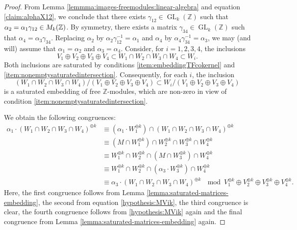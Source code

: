 \documentclass[a4paper,11pt,reqno]{amsart}
\numberwithin{equation}{section}
\theoremstyle{plain}
\theoremstyle{definition}
\newcommand{\Z}{\mathbb Z}
\let\rm\relax
\newcommand{\rm}[1]{{\mathrm{#1}}}
\newcommand{\GL}{\operatorname{GL}}
\begin{document}
\begin{proof}
From Lemma \ref{lemmma:images-freemodules:linear-algebra} and equation \eqref{claim:alphaX12}, we conclude that there exists $\gamma_{12} \in \GL_k(\Z)$ such that $\alpha_2 = \alpha_1 \gamma_{12} \in \rm{M}_k(\Z)$. By symmetry, there exists a matrix $\gamma_{34} \in \GL_k(\Z)$ such that $\alpha_4 = \alpha_3\gamma_{34}$. Replacing $\alpha_2$ by $\alpha_2 \gamma_{12}^{-1} = \alpha_1$ and $\alpha_4$ by $\alpha_4\gamma_{34}^{-1} = \alpha_3$, we may (and will) assume that $\alpha_1 = \alpha_2$ and $\alpha_3 = \alpha_4$. 
Consider, for $i = 1,2,3,4$, the inclusions
\[
V_1 \oplus V_2 \oplus V_3 \oplus V_4 \subset W_1 \cap W_2 \cap W_3 \cap W_4 \subset W_i. 
\]
Both inclusions are saturated by conditions \eqref{item:embeddingTFcokernel} and \eqref{item:nonemptysaturatedintersection}. Consequently, for each $i$, the inclusion
\[
\left(W_1 \cap W_2 \cap W_3 \cap W_4 \right)/\left(V_1 \oplus V_2 \oplus V_3 \oplus V_4 \right) \subset W_i/\left(V_1 \oplus V_2 \oplus V_3 \oplus V_4 \right)
\]
is a saturated embedding of free $\Z$-modules, which are non-zero in view of condition \eqref{item:nonemptysaturatedintersection}. 

We obtain the following congruences:
\begin{align*}
\alpha_1 \cdot (W_1 \cap W_2 \cap W_3 \cap W_4)^{\oplus k} &\equiv \left( \alpha_1 \cdot W_1^{\oplus k} \right) \cap \left(W_1 \cap W_2 \cap W_3 \cap W_4\right)^{\oplus k} 
\\
& \equiv \left(M \cap  W_1^{\oplus k}\right) \cap W_2^{\oplus k} \cap W_3^{\oplus k} \cap W_4^{\oplus k}   \\
&\equiv W_1^{\oplus k} \cap W_2^{\oplus k} \cap \left(M\cap W_3^{\oplus k}\right) \cap W_4^{\oplus k} \\
& \equiv W_1^{\oplus k} \cap W_2^{\oplus k} \cap \left(\alpha_3 \cdot W_3^{\oplus k}\right) \cap W_4^{\oplus k} \\
& \equiv  \alpha_3 \cdot \left(W_1 \cap W_2 \cap W_3 \cap W_4\right)^{\oplus k} \  \mod V_1^{\oplus k} \oplus V_2^{\oplus k} \oplus V_3^{\oplus k} \oplus V_4^{\oplus k}. 
\end{align*}
Here, the first congruence follows from Lemma \ref{lemma:saturated-matrices-embedding}, the second from equation \eqref{hypothesis:MVik}, the third congruence is clear, the fourth congruence follows from \eqref{hypothesis:MVik} again and the final congruence from Lemma \ref{lemma:saturated-matrices-embedding} again. 


\end{proof}
\end{document}
